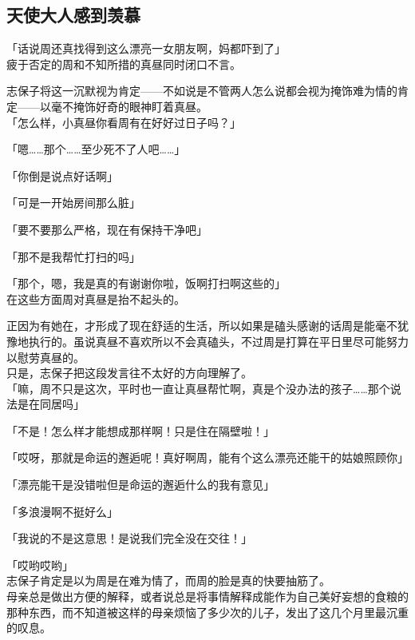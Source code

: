 \subsection{天使大人感到羡慕}

「话说周还真找得到这么漂亮一女朋友啊，妈都吓到了」\\

疲于否定的周和不知所措的真昼同时闭口不言。

志保子将这一沉默视为肯定——不如说是不管两人怎么说都会视为掩饰难为情的肯定——以毫不掩饰好奇的眼神盯着真昼。\\

「怎么样，小真昼你看周有在好好过日子吗？」

「嗯……那个……至少死不了人吧……」

「你倒是说点好话啊」

「可是一开始房间那么脏」

「要不要那么严格，现在有保持干净吧」

「那不是我帮忙打扫的吗」

「那个，嗯，我是真的有谢谢你啦，饭啊打扫啊这些的」\\

在这些方面周对真昼是抬不起头的。

正因为有她在，才形成了现在舒适的生活，所以如果是磕头感谢的话周是能毫不犹豫地执行的。虽说真昼不喜欢所以不会真磕头，不过周是打算在平日里尽可能努力以慰劳真昼的。\\

只是，志保子把这段发言往不太好的方向理解了。\\

「嘛，周不只是这次，平时也一直让真昼帮忙啊，真是个没办法的孩子……那个说法是在同居吗」

「不是！怎么样才能想成那样啊！只是住在隔壁啦！」

「哎呀，那就是命运的邂逅呢！真好啊周，能有个这么漂亮还能干的姑娘照顾你」

「漂亮能干是没错啦但是命运的邂逅什么的我有意见」

「多浪漫啊不挺好么」

「我说的不是这意思！是说我们完全没在交往！」

「哎哟哎哟」\\

志保子肯定是以为周是在难为情了，而周的脸是真的快要抽筋了。\\

母亲总是做出方便的解释，或者说总是将事情解释成能作为自己美好妄想的食粮的那种东西，而不知道被这样的母亲烦恼了多少次的儿子，发出了这几个月里最沉重的叹息。\\


